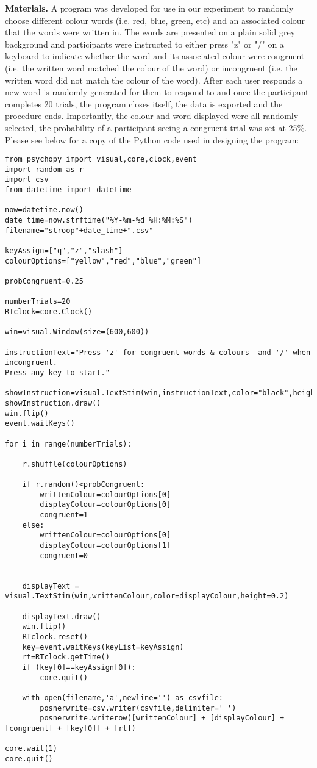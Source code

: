 \documentclass{article}
\begin{document}
\textbf{Materials.} A program was developed for use in our experiment to randomly choose different colour words (i.e. red, blue, green, etc) and an associated colour that the words were written in. The words are presented on a plain solid grey background and participants were instructed to either press "z" or "/" on a keyboard to indicate whether the word and its associated colour were congruent (i.e. the written word matched the colour of the word) or incongruent (i.e. the written word did not match the colour of the word). After each user responds a new word is randomly generated for them to respond to and once the participant completes 20 trials, the program closes itself, the data is exported and the procedure ends. Importantly, the colour and word displayed were all randomly selected, the probability of a participant seeing a congruent trial was set at 25\%. \\

Please see below for a copy of the Python code used in designing the program: \\
\begin{verbatim}
from psychopy import visual,core,clock,event
import random as r
import csv
from datetime import datetime

now=datetime.now()
date_time=now.strftime("%Y-%m-%d_%H:%M:%S")
filename="stroop"+date_time+".csv"

keyAssign=["q","z","slash"]
colourOptions=["yellow","red","blue","green"]

probCongruent=0.25

numberTrials=20
RTclock=core.Clock()

win=visual.Window(size=(600,600))

instructionText="Press 'z' for congruent words & colours  and '/' when incongruent. 
Press any key to start."

showInstruction=visual.TextStim(win,instructionText,color="black",height=0.1)
showInstruction.draw()
win.flip()
event.waitKeys()

for i in range(numberTrials):

	r.shuffle(colourOptions)

	if r.random()<probCongruent:
		writtenColour=colourOptions[0]
		displayColour=colourOptions[0]
		congruent=1
	else:
		writtenColour=colourOptions[0]
		displayColour=colourOptions[1]
		congruent=0


	displayText = visual.TextStim(win,writtenColour,color=displayColour,height=0.2)

	displayText.draw()
	win.flip()
	RTclock.reset()
	key=event.waitKeys(keyList=keyAssign)
	rt=RTclock.getTime()
	if (key[0]==keyAssign[0]):
		core.quit()

	with open(filename,'a',newline='') as csvfile:
		posnerwrite=csv.writer(csvfile,delimiter=' ')
		posnerwrite.writerow([writtenColour] + [displayColour] + [congruent] + [key[0]] + [rt])

core.wait(1)
core.quit()
\end{verbatim}
\end{document}
